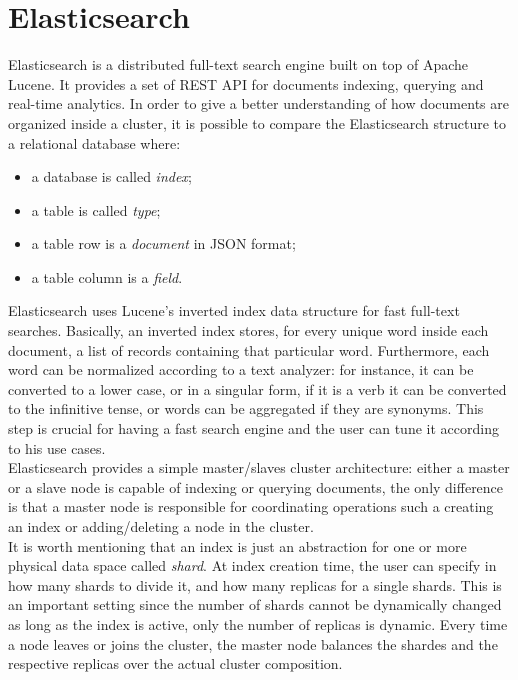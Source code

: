 \section{Elasticsearch}
Elasticsearch \cite{bib42} is a distributed full-text search engine built on top of Apache Lucene. It provides a set of REST API for documents indexing, querying and real-time analytics. In order to give a better understanding of how documents are organized inside a cluster, it is possible to compare the Elasticsearch structure to a relational database where:
\begin{itemize}
\item a database is called \textit{index};
\item a table is called \textit{type};
\item a table row is a \textit{document} in JSON format;
\item a table column is a \textit{field}.
\end{itemize}
Elasticsearch uses Lucene's inverted index data structure for fast full-text searches. Basically, an inverted index stores, for every unique word inside each document, a list of records containing that particular word. Furthermore, each word can be normalized according to a text analyzer: for instance, it can be converted to a lower case, or in a singular form, if it is a verb it can be converted to the infinitive tense, or words can be aggregated if they are synonyms. This step is crucial for having a fast search engine and the user can tune it according to his use cases.\\
Elasticsearch provides a simple master/slaves cluster architecture: either a master or a slave node is capable of indexing or querying documents, the only difference is that a master node is responsible for coordinating operations such a creating an index or adding/deleting a node in the cluster.\\
It is worth mentioning that an index is just an abstraction for one or more physical data space called \textit{shard}. At index creation time, the user can specify in how many shards to divide it, and how many replicas for a single shards. This is an important setting since the number of shards cannot be dynamically changed as long as the index is active, only the number of replicas is dynamic. Every time a node leaves or joins the cluster, the master node balances the shardes and the respective replicas over the actual cluster composition.
